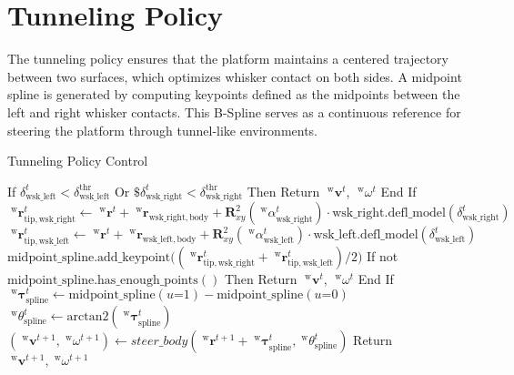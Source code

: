 \section{Tunneling Policy}

The tunneling policy ensures that the platform maintains a centered trajectory between two surfaces, which optimizes whisker contact on both sides.
A midpoint spline is generated by computing keypoints defined as the midpoints between the left and right whisker contacts.
This B-Spline serves as a continuous reference for steering the platform through tunnel-like environments.

\begin{algorithm}
    \caption{Tunneling Policy Control}
    \label{alg:tunneling_policy}
    \begin{algorithmic}
        \State If \(\delta_{\mathrm{wsk\_left}}^{t} < \delta_{\mathrm{wsk\_left}}^{\mathrm{thr}}\) Or \(\$\delta_{\mathrm{wsk\_right}}^{t} < \delta_{\mathrm{wsk\_right}}^{\mathrm{thr}}\) Then
        \State \quad Return \(\;^{\mathrm{w}}\boldsymbol{v}^{t}\), \(\;^{\mathrm{w}}\omega^{t}\)
        \State End If
        \State
        \State \(\;^{\mathrm{w}}\boldsymbol{r}_{\mathrm{tip, wsk\_right}}^{t} \gets \;^{\mathrm{w}}\boldsymbol{r}^{t} + \;^{\mathrm{w}}\boldsymbol{r}_{\mathrm{wsk\_right, body}} + \boldsymbol{R}_{xy}^{2}(\; ^{\mathrm{w}}\alpha_{\mathrm{wsk\_right}}^{t}) \cdot \mathrm{wsk\_right.defl\_model}(\delta_{\mathrm{wsk\_right}}^{t})\)
        \State \(\;^{\mathrm{w}}\boldsymbol{r}_{\mathrm{tip, wsk\_left}}^{t} \gets \;^{\mathrm{w}}\boldsymbol{r}^{t} + \;^{\mathrm{w}}\boldsymbol{r}_{\mathrm{wsk\_left, body}} + \boldsymbol{R}_{xy}^{2}(\; ^{\mathrm{w}}\alpha_{\mathrm{wsk\_left}}^{t}) \cdot \mathrm{wsk\_left.defl\_model}(\delta_{\mathrm{wsk\_left}}^{t})\)
        \State \(\mathrm{midpoint\_spline.add\_keypoint}\big((\;^{\mathrm{w}}\boldsymbol{r}_{\mathrm{tip, wsk\_right}}^{t} + \;^{\mathrm{w}}\boldsymbol{r}_{\mathrm{tip, wsk\_left}}^{t}) / 2\big)\)
        \State If not \(\mathrm{midpoint\_spline.has\_enough\_points()}\) Then
        \State \quad Return \(\;^{\mathrm{w}}\boldsymbol{v}^{t}\), \(\;^{\mathrm{w}}\omega^{t}\)
        \State End If
        \State
        \State \(\;^{\mathrm{w}}\boldsymbol{\tau}_{\mathrm{spline}}^{t} \gets \mathrm{midpoint\_spline}(u\mathord{=}1) - \mathrm{midpoint\_spline}(u\mathord{=}0)\)
        \State \(\;^{\mathrm{w}}\theta_{\mathrm{spline}}^{t} \gets \mathrm{arctan2}(\;^{\mathrm{w}}\boldsymbol{\tau}_{\mathrm{spline}}^{t})\)
        \State
        \State \((\;^{\mathrm{w}}\boldsymbol{v}^{t+1}, \;^{\mathrm{w}}\omega^{t+1}) \gets steer\_body(\;^{\mathrm{w}}\boldsymbol{r}^{t+1} + \;^{\mathrm{w}}\boldsymbol{\tau}_{\mathrm{spline}}^{t},\;^{\mathrm{w}}\theta_{\mathrm{spline}}^{t})\)
        \State Return \(\;^{\mathrm{w}}\boldsymbol{v}^{t+1}, \;^{\mathrm{w}}\omega^{t+1}\)
    \end{algorithmic}
\end{algorithm}


